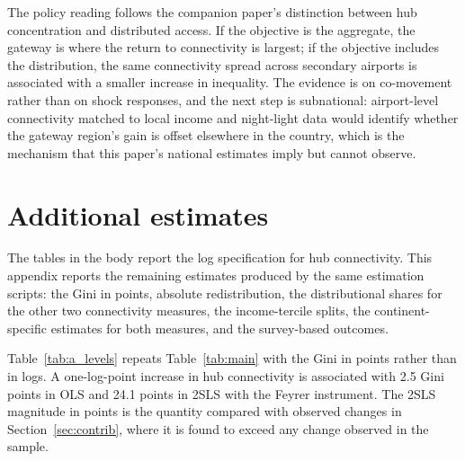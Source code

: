 The policy reading follows the companion paper's distinction between hub concentration and distributed access. If the objective is the aggregate, the gateway is where the return to connectivity is largest; if the objective includes the distribution, the same connectivity spread across secondary airports is associated with a smaller increase in inequality. The evidence is on co-movement rather than on shock responses, and the next step is subnational: airport-level connectivity matched to local income and night-light data would identify whether the gateway region's gain is offset elsewhere in the country, which is the mechanism that this paper's national estimates imply but cannot observe.

\appendix
\section{Additional estimates}
\label{app:additional}
The tables in the body report the log specification for hub connectivity. This appendix reports the remaining estimates produced by the same estimation scripts: the Gini in points, absolute redistribution, the distributional shares for the other two connectivity measures, the income-tercile splits, the continent-specific estimates for both measures, and the survey-based outcomes.

Table~\ref{tab:a_levels} repeats Table~\ref{tab:main} with the Gini in points rather than in logs. A one-log-point increase in hub connectivity is associated with 2.5 Gini points in OLS and 24.1 points in 2SLS with the Feyrer instrument. The 2SLS magnitude in points is the quantity compared with observed changes in Section~\ref{sec:contrib}, where it is found to exceed any change observed in the sample.

